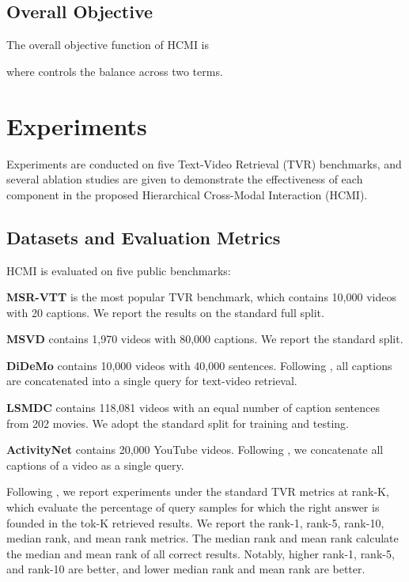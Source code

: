 \documentclass{article}
\begin{document}
\subsection{Overall Objective}
The overall objective function of HCMI is

where  controls the balance across two terms.



\section{Experiments}
Experiments are conducted on five Text-Video Retrieval (TVR) benchmarks, and several ablation studies are given to demonstrate the effectiveness of each component in the proposed Hierarchical Cross-Modal Interaction (HCMI).


\subsection{Datasets and Evaluation Metrics}
HCMI is evaluated on five public benchmarks:

\noindent\textbf{MSR-VTT}\cite{xu2016msr} is the most popular TVR benchmark, which contains 10,000 videos with 20 captions. We report the results on the standard full split.

\noindent\textbf{MSVD}\cite{wu2017deep} contains 1,970 videos with 80,000 captions. We report the standard split.

\noindent\textbf{DiDeMo}\cite{rohrbach2015dataset} contains 10,000 videos with 40,000 sentences. Following \cite{luo2021clip4clip}, all captions are concatenated into a single query for text-video retrieval.

\noindent\textbf{LSMDC}\cite{anne2017localizing} contains 118,081 videos with an equal number of caption sentences from 202 movies. We adopt the standard split for training and testing.

\noindent\textbf{ActivityNet}\cite{caba2015activitynet} contains 20,000 YouTube videos. Following \cite{luo2021clip4clip}, we concatenate all captions of a video as a single query.

Following \cite{luo2021clip4clip}, we report experiments under the standard TVR metrics at rank-K, which evaluate the percentage of query samples for which the right answer is founded in the tok-K retrieved results.
We report the rank-1, rank-5, rank-10, median rank, and mean rank metrics. 
The median rank and mean rank calculate the median and mean rank of all correct results.
Notably, higher rank-1, rank-5, and rank-10 are better, and lower median rank and mean rank are better.
\end{document}
